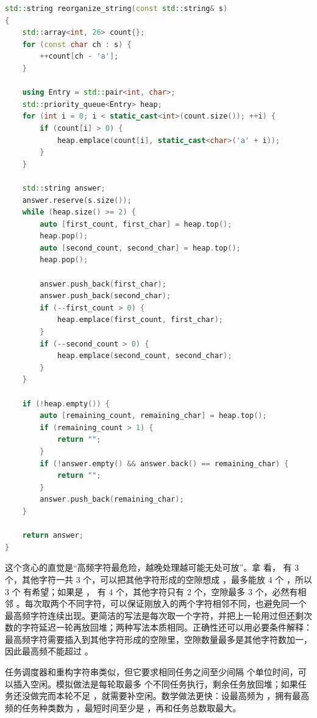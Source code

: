 \begin{lstlisting}[language=C++,caption={LeetCode 767 重构字符串：每次取两个最高频字符}]
std::string reorganize_string(const std::string& s)
{
    std::array<int, 26> count{};
    for (const char ch : s) {
        ++count[ch - 'a'];
    }

    using Entry = std::pair<int, char>;
    std::priority_queue<Entry> heap;
    for (int i = 0; i < static_cast<int>(count.size()); ++i) {
        if (count[i] > 0) {
            heap.emplace(count[i], static_cast<char>('a' + i));
        }
    }

    std::string answer;
    answer.reserve(s.size());
    while (heap.size() >= 2) {
        auto [first_count, first_char] = heap.top();
        heap.pop();
        auto [second_count, second_char] = heap.top();
        heap.pop();

        answer.push_back(first_char);
        answer.push_back(second_char);
        if (--first_count > 0) {
            heap.emplace(first_count, first_char);
        }
        if (--second_count > 0) {
            heap.emplace(second_count, second_char);
        }
    }

    if (!heap.empty()) {
        auto [remaining_count, remaining_char] = heap.top();
        if (remaining_count > 1) {
            return "";
        }
        if (!answer.empty() && answer.back() == remaining_char) {
            return "";
        }
        answer.push_back(remaining_char);
    }

    return answer;
}
\end{lstlisting}

这个贪心的直觉是“高频字符最危险，越晚处理越可能无处可放”。拿  看， 有 3 个，其他字符一共 3 个，可以把其他字符形成的空隙想成 ，最多能放 4 个 ，所以 3 个  有希望；如果是 ， 有 4 个，其他字符只有 2 个，空隙最多 3 个，必然有相邻 。每次取两个不同字符，可以保证刚放入的两个字符相邻不同，也避免同一个最高频字符连续出现。更简洁的写法是每次取一个字符，并把上一轮用过但还剩次数的字符延迟一轮再放回堆；两种写法本质相同。正确性还可以用必要条件解释：最高频字符需要插入到其他字符形成的空隙里，空隙数量最多是其他字符数加一，因此最高频不能超过 。

任务调度器和重构字符串类似，但它要求相同任务之间至少间隔  个单位时间，可以插入空闲。模拟做法是每轮取最多  个不同任务执行，剩余任务放回堆；如果任务还没做完而本轮不足 ，就需要补空闲。数学做法更快：设最高频为 ，拥有最高频的任务种类数为 ，最短时间至少是 ，再和任务总数取最大。


